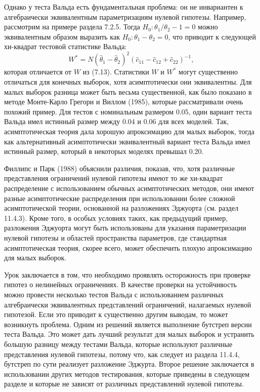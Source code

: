 Однако у теста Вальда есть фундаментальная проблема: он не инвариантен к алгебраически эквивалентным параметризациям нулевой гипотезы. Например, рассмотрим на примере раздела 7.2.5. Тогда $H_0: \theta_1/\theta_2 - 1 = 0$ можно эквивалентным образом выразить как $H_0: \theta_1 - \theta_2 = 0$, что приводит к следующей хи-квадрат тестовой статистике Вальда:
\begin{equation}
W^* = N(\hat{\theta}_1 - \hat{\theta}_2)^2(\hat{c}_{11} - \hat{c}_{12} + \hat{c}_{22})^{-1},
\end{equation}
которая отличается от $W$ из (7.13). Статистики $W$ и $W^*$ могут существенно отличаться для конечных выборок, хотя асимптотически они эквивалентны. Для малых выборок разница может быть весьма существенной, как было показано в методе Монте-Карло Грегори и Виллом (1985), которые рассматривали очень похожий пример. Для тестов с номинальным размером 0.05, один вариант теста Вальда имел истинный размер между 0.04 и 0.06 для всех моделей. Так, асимптотическая теория дала хорошую апроксимацию для малых выборок, тогда как альтернативный асимптотически эквивалентный вариант теста Вальда имел истинный размер, который в некоторых моделях превышал 0.20.

Филлипс и Парк (1988) объяснили различия, показав, что, хотя различные представления ограничений нулевой гипотезы  имеют то же хи-квадрат распределение с использованием обычных асимптотических методов, они имеют разные асимптотические распределения при использовании более сложной асимптотической теории, основанной на разложениях Эджуорта (см. раздел 11.4.3). Кроме того, в особых условиях таких, как предыдущий пример, разложения Эджуорта могут быть использованы для указания параметризации нулевой гипотезы и областей пространства параметров, где стандартная асимптотическая теория, скорее всего, может обеспечить плохую апроксимацию для малых выборок.

Урок заключается в том, что необходимо проявлять осторожность при проверке гипотез о нелинейных ограничениях. В качестве проверки на устойчивость можно провести несколько тестов Вальда с использованием различных алгебраически эквивалентных представлений ограничений, налагаемых нулевой гипотезой. Если это приводит к существенно другим выводам, то может возникнуть проблема. Одним из решений является выполнение бутстреп версии теста Вальда. Это может дать лучший результат для малых выборок и устранить большую разницу между тестами Вальда, которые используют различные представления нулевой гипотезы, потому что, как следует из раздела 11.4.4, бутстреп по сути реализует разложение Эджурта. Второе решение заключается в использовании других методов тестирования, которые приведены в следующем разделе и которые не зависят от различных представлений нулевой гипотезы.

